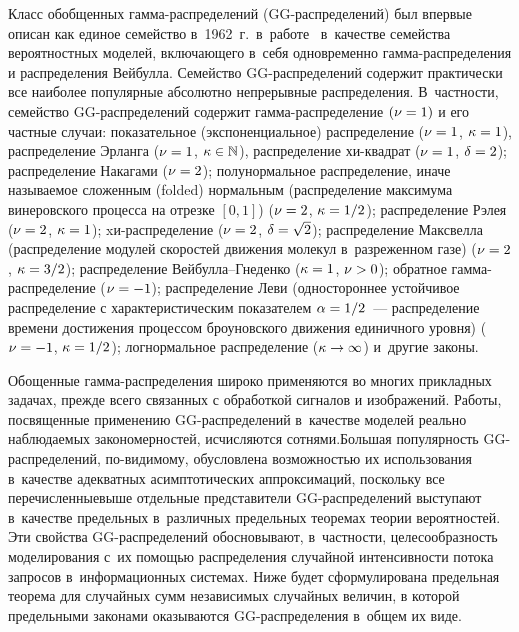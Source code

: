 \begin{multicols}{2}
Класс обобщенных гамма-рас\-пре\-де\-ле\-ний (GG-рас\-пре\-де\-ле\-ний) был впервые
описан как единое семейство в~1962~г.\ в~работе~\cite{Stacy1962} 
в~качестве семейства вероятностных моделей, включающего в~себя
одновременно гам\-ма-рас\-пре\-де\-ле\-ния и распределения Вейбулла. Семейство
GG-рас\-пре\-де\-ле\-ний содержит практически все наиболее популярные
абсолютно непрерывные распределения. В~частности, семейство
GG-рас\-пре\-де\-ле\-ний содержит гам\-ма-рас\-пре\-де\-ле\-ние $(\nu\hm=1)$ и его
частные случаи: показательное (экспоненциальное) распределение
($\nu\hm=1$, $\kappa\hm=1$), распределение Эрланга ($\nu\hm=1$,
$\kappa\hm\in\mathbb{N}$), распределение хи-квад\-рат ($\nu\hm=1$,
$\delta\hm=2$); распределение Накагами ($\nu\hm=2$); полунормальное
распределение, иначе называемое сложенным (folded) нормальным
(распределение максимума винеровского процесса на отрезке $[0,1]$)
($\nu\hm=2$, $\kappa\hm=1/2$); распределение Рэлея ($\nu\hm=2$,
$\kappa\hm=1$); xи-рас\-пре\-де\-ле\-ние ($\nu\hm=2$, $\delta\hm=\sqrt{2}$);
распределение Максвелла (распределение модулей скоростей движения
молекул в~разреженном газе) ($\nu\hm=2$, $\kappa\hm=3/2$);
распределение Вей\-бул\-ла--Гне\-ден\-ко ($\kappa\hm=1$, $\nu\hm>0$); обратное
гам\-ма-рас\-пре\-де\-ле\-ние ($\nu\hm=-1$); распределение Леви (одностороннее
устойчивое распределение с характеристическим показателем
$\alpha\hm=1/2$~--- распределение времени достижения процессом
броуновского движения единичного уровня) ($\nu\hm=-1$,
$\kappa\hm=1/2$); логнормальное распределение ($\kappa\hm\to\infty$) и~другие законы.

Обощенные гамма-распределения широко применяются во многих прикладных задачах,
прежде всего связанных с обработкой сигналов и изображений. Работы,
посвященные применению GG-рас\-пре\-де\-ле\-ний в~качестве моделей реально
наблюдаемых закономерностей, исчисляются сотнями.\linebreak Большая
популярность GG-рас\-пре\-де\-ле\-ний, по-ви\-ди\-мо\-му, обуслов\-ле\-на возможностью
их ис\-поль\-зо\-вания в~качестве адекватных асимптотических
аппроксимаций, поскольку все перечисленные\linebreak вы\-ше отдельные
представители GG-рас\-пре\-де\-ле\-ний выступают в~качестве предель\-ных 
в~различных предель\-ных тео\-ре\-мах тео\-рии вероятностей. Эти свойства
GG-распределений обосновывают, в~част\-ности, целесообразность
моделирования с~их по\-мощью распределения случайной интенсив\-ности
потока запросов в~информационных системах. Ниже будет сформулирована
предельная теорема для случайных сумм независимых случайных величин,
в которой предельными законами оказываются GG-рас\-пре\-де\-ле\-ния в~общем их виде.


\end{multicols}
